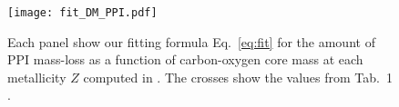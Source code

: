 \documentclass[twocolumn]{aastex63}
\DeclareRobustCommand{\Eqref}[1]{Eq.~\ref{#1}}
\begin{document}
\begin{figure}[ht!]
    \begin{centering}
      \texttt{[image: fit\_DM\_PPI.pdf]}
      \caption{Each panel show our fitting formula \Eqref{eq:fit} for
        the amount of PPI mass-loss as a function of carbon-oxygen
        core mass at each metallicity $Z$ computed in
        \cite{farmer:19}. The crosses show the values from Tab.~1
        \cite{farmer:19}.}
        \label{fig:fit_DM_PPI}
    \end{centering}
\end{figure}


\end{document}
